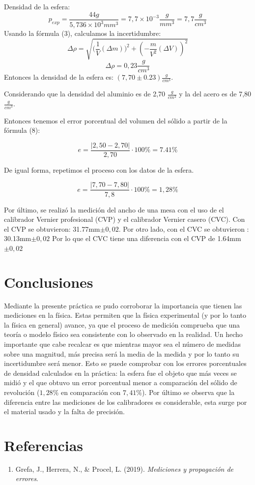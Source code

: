\documentclass[a4paper]{article}
\begin{document}
Densidad de la esfera:
\[p_{exp}=\frac{44g}{5,736 \times 10^3 mm^3}= 7,7 \times 10^{-3} \frac{g}{mm^3}=7,7\frac{g}{cm^3}\] 
Usando la fórmula (3), calculamos la incertidumbre:
\[\Delta \rho=\sqrt{({\frac{1}{V}(\Delta{m}))^2+  (-\frac{m}{V^2} (\Delta{V}))^2}}\]
\[\Delta \rho=0,23 \frac{g}{cm^3}\]
Entonces la densidad de la esfera es: $(7,70\pm0.23) \frac{g}{cm^3}$.

Considerando que la densidad del aluminio es de 2,70 $\frac{g}{cm^3}$ y la del acero es de 7,80 $\frac{g}{cm^3}$.

Entonces tenemos el error porcentual del volumen del sólido a partir de la fórmula (8):

\[e=\frac{|2,50 - 2,70|}{2,70}\cdot 100 \%=7.41\%\]

De igual forma, repetimos el proceso con los datos de la esfera.

\[e=\frac{|7,70 - 7,80|}{7,8}\cdot 100 \%=1,28\%\]


Por último, se realizó la medición del ancho de una mesa con el uso de el calibrador Vernier profesional (CVP) y el calibrador Vernier casero (CVC).
Con el CVP se obtuvieron: 31.77mm$\pm {0,02}$. Por otro lado, con el CVC se obtuvieron : 30.13mm$\pm {0,02}$
Por lo que el CVC tiene una diferencia con el CVP de 1.64mm $\pm {0,02}$

\section{Conclusiones}
Mediante la presente práctica se pudo corroborar la importancia que tienen las mediciones en la física. Estas permiten que la física experimental (y por lo tanto la física en general) avance, ya que el proceso de medición comprueba que una teoría o modelo físico sea consistente con lo observado en la realidad. Un hecho importante que cabe recalcar es que mientras mayor sea el número de medidas sobre una magnitud, más precisa será la media de la medida y por lo tanto su incertidumbre será menor. Esto se puede comprobar con los errores porcentuales de densidad calculados en la práctica: la esfera fue el objeto que más veces se midió y el que obtuvo un error porcentual menor a comparación del sólido de revolución ($1,28\%$ en comparación con  $7,41\%$). Por último se observa que la diferencia entre las mediciones de los calibradores es considerable, esta surge por el material usado y la falta de precisión.


\section{Referencias}
\begin{enumerate}
    \item Grefa, J., Herrera, N., \& Procel, L. (2019). \textit{Mediciones y propagación de errores}.
\end{enumerate}
\end{document}
